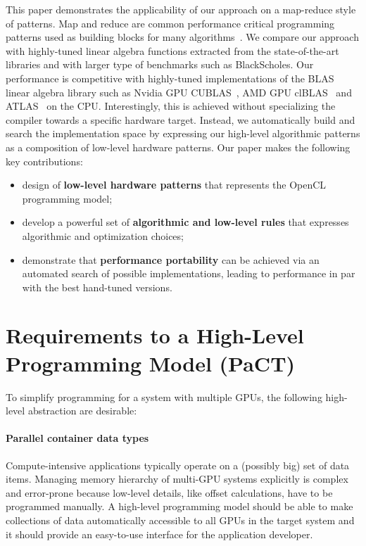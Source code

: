 This paper demonstrates the applicability of our approach on a map-reduce style of patterns.
Map and reduce are common performance critical programming patterns used as building blocks for many algorithms~\cite{asanovic06thelandscape}.
We compare our approach with highly-tuned linear algebra functions extracted from the state-of-the-art libraries and with larger type of benchmarks such as BlackScholes.
Our performance is competitive with highly-tuned implementations of the BLAS linear algebra library such as Nvidia GPU CUBLAS~\cite{cuBLAS}, AMD GPU clBLAS~\cite{clBlas} and ATLAS~\cite{whaley98atlas} on the CPU.
Interestingly, this is achieved without specializing the compiler towards a specific hardware target.
Instead, we automatically build and search the implementation space by expressing our high-level algorithmic patterns as a composition of low-level hardware patterns.
Our paper makes the following key contributions:
\vspace{0.2em}
\begin{itemize}
  \item design of \textbf{low-level hardware patterns} that represents the OpenCL programming model; \vspace{0pt}
  \item develop a powerful set of \textbf{algorithmic and low-level rules} that expresses algorithmic and optimization choices; \vspace{0pt}
  \item demonstrate that \textbf{performance portability} can be achieved via an automated search of possible implementations, leading to performance in par with the best hand-tuned versions. \vspace{0pt}
\end{itemize}




\section{Requirements to a High-Level Programming Model (PaCT)}
To simplify programming for a system with multiple GPUs, the following high-level abstraction are desirable:

\paragraph{Parallel container data types}
Compute-intensive applications typically operate on a (possibly big) set of data items.
Managing memory hierarchy of multi-GPU systems explicitly is complex and error-prone because low-level details, like offset calculations, have to be programmed manually.
A high-level programming model should be able to make collections of data automatically accessible to all GPUs in the target system and it should provide an easy-to-use interface for the application developer.

